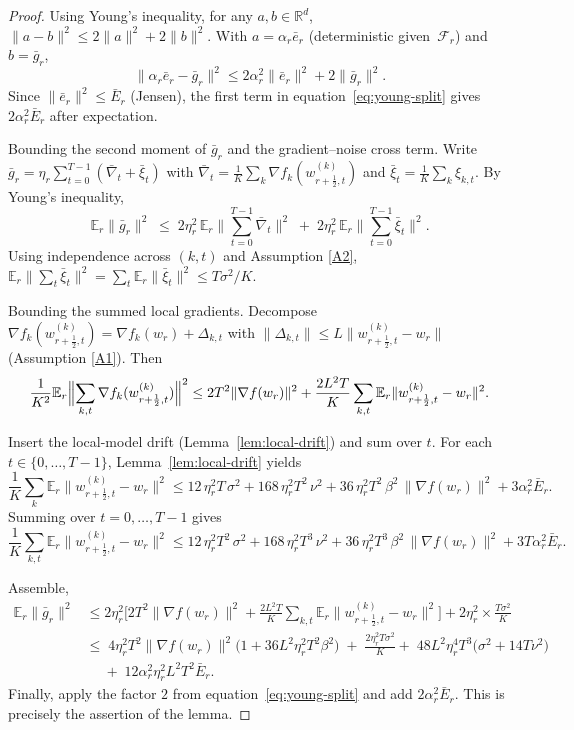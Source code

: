 \documentclass{article} %
\def\eqref#1{equation~\ref{#1}}
\newcommand{\E}{\mathbb{E}}
\newcommand{\R}{\mathbb{R}}
\begin{document}
\begin{proof}
Using Young’s inequality, for any $a,b\in\R^d$, $\|a-b\|^2\le2\|a\|^2+2\|b\|^2$.  
With $a=\alpha_r\bar e_r$ (deterministic given~$\mathcal F_r$) 
and $b=\bar g_r$,
\begin{equation}
\|\alpha_r\bar e_r-\bar g_r\|^{2}
\le
2\alpha_r^{2}\|\bar e_r\|^{2}+2\|\bar g_r\|^{2}.
\label{eq:young-split}
\end{equation}
Since $\|\bar e_r\|^{2}\le\bar E_r$ (Jensen), 
the first term in \eqref{eq:young-split} gives $2\alpha_r^{2}\bar E_r$ after expectation.

Bounding the second moment of $\bar g_r$ and the gradient–noise cross term.
Write $\bar g_r=\eta_r\sum_{t=0}^{T-1}(\bar\nabla_t+\bar\xi_t)$ with
$\bar\nabla_t=\tfrac1K\sum_k\nabla f_k(w_{r+\frac12,t}^{(k)})$ and
$\bar\xi_t=\tfrac1K\sum_k\xi_{k,t}$.
By Young’s inequality,
\[
\E_r\|\bar g_r\|^{2}
\;\le\;
2\eta_r^{2}\,\E_r\Big\|\sum_{t=0}^{T-1}\bar\nabla_t\Big\|^{2}
\;+\;2\eta_r^{2}\,\E_r\Big\|\sum_{t=0}^{T-1}\bar\xi_t\Big\|^{2}.
\]
Using independence across $(k,t)$ and Assumption \ref{A2},
$\E_r\|\sum_t\bar\xi_t\|^{2}=\sum_t\E_r\|\bar\xi_t\|^{2}\le T\sigma^2/K$.

Bounding the summed local gradients.
Decompose
$\nabla f_k(w_{r+\frac12,t}^{(k)})=\nabla f_k(w_r)+\Delta_{k,t}$ with
$\|\Delta_{k,t}\|\le L\|w_{r+\frac12,t}^{(k)}-w_r\|$ (Assumption \ref{A1}). Then
\[
\frac{1}{K^{2}}
  \E_r\Bigl\|\sum_{k,t}\nabla f_k(w_{r+\frac12,t}^{(k)})\Bigr\|^{2}
\le
2T^{2}\|\nabla f(w_r)\|^{2}
+\frac{2L^{2}T}{K}
  \sum_{k,t}\E_r\|w_{r+\frac12,t}^{(k)}-w_r\|^{2}.
\]

Insert the local-model drift (Lemma~\ref{lem:local-drift}) and sum over $t$. 
For each $t\in\{0,\dots,T-1\}$, Lemma~\ref{lem:local-drift} yields
\[
\frac1K\sum_k\E_r\|w_{r+\frac12,t}^{(k)}-w_r\|^{2}
\le
12\,\eta_r^{2}T\,\sigma^{2}
+168\,\eta_r^{2}T^{2}\,\nu^{2}
+36\,\eta_r^{2}T^{2}\,\beta^{2}\,\|\nabla f(w_r)\|^{2} 
+3\alpha_r^2 \bar E_r.
\]
Summing over $t=0,\dots,T-1$ gives
\[
\frac1K\sum_{k,t}\E_r\|w_{r+\frac12,t}^{(k)}-w_r\|^{2}
\le
12\,\eta_r^{2}T^{2}\,\sigma^{2}
+168\,\eta_r^{2}T^{3}\,\nu^{2}
+36\,\eta_r^{2}T^{3}\,\beta^{2}\,\|\nabla f(w_r)\|^{2}
+3T\alpha_r^2 \bar E_r.
\]

Assemble,
\[
\begin{aligned}
\E_r\|\bar g_r\|^{2}
&\le
2\eta_r^{2}\Big[
2T^{2}\|\nabla f(w_r)\|^{2}
+\frac{2L^{2}T}{K}\!\sum_{k,t}\E_r\|w_{r+\frac12,t}^{(k)}-w_r\|^{2}
\Big]
+2\eta_r^{2}\times \frac{T\sigma^{2}}{K}\\
&\le
\;4\eta_r^{2}T^{2}\|\nabla f(w_r)\|^{2}\bigl(1+36L^{2}\eta_r^{2}T^{2}\beta^{2}\bigr)
\;+\;\frac{2\eta_r^{2}T\sigma^{2}}{K}+\;48L^{2}\eta_r^{4}T^{3}\bigl(\sigma^{2}+14T\nu^{2}\bigr)\\
&\quad
\;+\;12\alpha_r^{2}\eta_r^{2}L^{2}T^{2}\bar E_r.
\end{aligned}
\]
Finally, apply the factor \(2\) from \eqref{eq:young-split} and add
\(2\alpha_r^2\bar E_r\). This is precisely the assertion of the lemma.
\end{proof}
\end{document}
